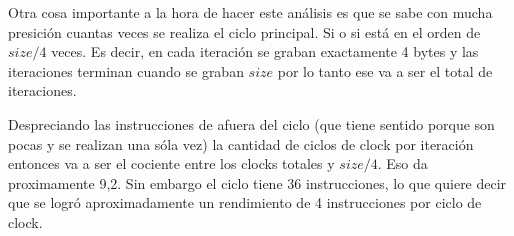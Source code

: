 	Otra cosa importante a la hora de hacer este análisis es que se sabe con mucha presición
cuantas veces se realiza el ciclo principal. Si o si está en el orden de $size/4$ veces. Es decir,
en cada iteración se graban exactamente 4 bytes y las iteraciones terminan cuando se graban $size$
por lo tanto ese va a ser el total de iteraciones.

	Despreciando las instrucciones de afuera del ciclo (que tiene sentido porque son pocas y se
realizan una sóla vez) la cantidad de ciclos de clock por iteración entonces va a ser el cociente
entre los clocks totales y $size/4$. Eso da proximamente 9,2. Sin embargo el ciclo tiene 36
instrucciones, lo que quiere decir que se logró aproximadamente un rendimiento de 4 instrucciones
por ciclo de clock.


